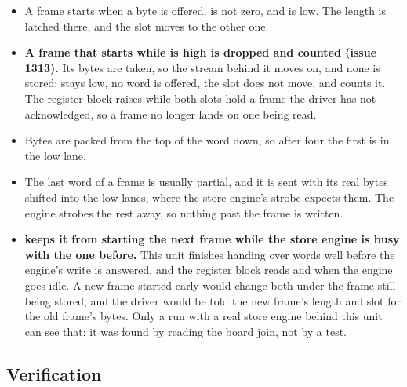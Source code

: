 \begin{itemize}
\item A frame starts when a byte is offered,  is not zero,
and  is low. The length is latched there, and the slot
moves to the other one.
\item \textbf{A frame that starts while  is high is
dropped and counted (issue 1313).} Its bytes are taken, so the stream
behind it moves on, and none is stored:  stays low, no
word is offered, the slot does not move, and  counts it.
The register block raises  while both slots hold a
frame the driver has not acknowledged, so a frame no longer lands on
one being read.
\item Bytes are packed from the top of the word down, so after four
the first is in the low lane.
\item The last word of a frame is usually partial, and it is sent with
its real bytes shifted into the low lanes, where the store engine's
strobe expects them. The engine strobes the rest away, so nothing past
the frame is written.
\item \textbf{ keeps it from starting the next frame while
the store engine is busy with the one before.} This unit finishes
handing over words well before the engine's write is answered, and the
register block reads  and  when the engine
goes idle. A new frame started early would change both under the
frame still being stored, and the driver would be told the new frame's
length and slot for the old frame's bytes. Only a run with a real
store engine behind this unit can see that; it was found by reading
the board join, not by a test.
\end{itemize}

\subsection*{Verification}

